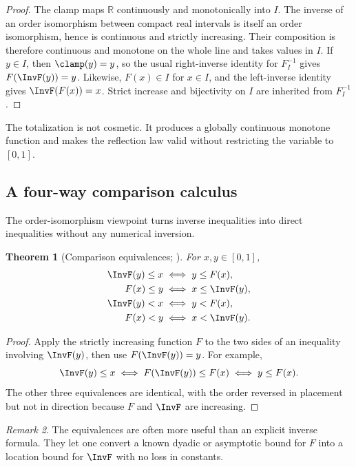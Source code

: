 \documentclass[11pt,oneside]{article}
\newtheorem{theorem}{Theorem}[section]
\theoremstyle{definition}
\theoremstyle{remark}
\newtheorem{remark}[theorem]{Remark}
\newcommand{\R}{\mathbb R}
\begin{document}
\begin{proof}
The clamp maps $\R$ continuously and monotonically into $I$.  The inverse
of an order isomorphism between compact real intervals is itself an order
isomorphism, hence is continuous and strictly increasing.  Their
composition is therefore continuous and monotone on the whole line and
takes values in $I$.  If $y\in I$, then $\clamp(y)=y$, so the usual
right-inverse identity for $F_I^{-1}$ gives $F(\InvF(y))=y$.  Likewise,
$F(x)\in I$ for $x\in I$, and the left-inverse identity gives
$\InvF(F(x))=x$.  Strict increase and bijectivity on $I$ are inherited
from $F_I^{-1}$.
\end{proof}

The totalization is not cosmetic.  It produces a globally continuous
monotone function and makes the reflection law valid without restricting
the variable to $[0,1]$.

\subsection{A four-way comparison calculus}

The order-isomorphism viewpoint turns inverse inequalities into direct
inequalities without any numerical inversion.

\begin{theorem}[Comparison equivalences; \Formalized]
\label{inverse:thm:inverse-comparisons}
For $x,y\in[0,1]$,
\begin{align}
 \InvF(y)\leq x&\iff y\leq F(x), \label{inverse:eq:inv-le}\\
 F(x)\leq y&\iff x\leq \InvF(y), \label{inverse:eq:F-le}\\
 \InvF(y)<x&\iff y<F(x), \label{inverse:eq:inv-lt}\\
 F(x)<y&\iff x<\InvF(y). \label{inverse:eq:F-lt}
\end{align}
\end{theorem}

\begin{proof}
Apply the strictly increasing function $F$ to the two sides of an
inequality involving $\InvF(y)$, then use $F(\InvF(y))=y$.  For example,
\[
 \InvF(y)\leq x
 \iff F(\InvF(y))\leq F(x)
 \iff y\leq F(x).
\]
The other three equivalences are identical, with the order reversed in
placement but not in direction because $F$ and $\InvF$ are increasing.
\end{proof}

\begin{remark}
The equivalences are often more useful than an explicit inverse formula.
They let one convert a known dyadic or asymptotic bound for $F$ into a
location bound for $\InvF$ with no loss in constants.
\end{remark}
\end{document}
